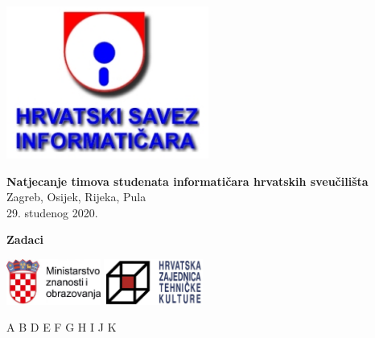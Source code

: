 \documentclass[a4paper]{article}
\begin{document}
\thispagestyle{empty}
\begin{center}
  \includegraphics[height=5cm]{pic/hsin.jpg}
\end{center}
\vspace{1cm}
\begin{center}
  {\Large\textbf{\textsf{Natjecanje timova studenata informatičara hrvatskih sveučilišta}}} \\
  \vspace{.5cm}
  {\large{\textsf{Zagreb, Osijek, Rijeka, Pula}}} \\
  \vspace{.3cm}
  \textsf{29. studenog 2020.}
\end{center}
\vspace{1cm}
\begin{center}
  {\large \textbf{Zadaci}}

  \begin{minipage}{.5\textwidth}
    \renewcommand\contentsname{}
    \tableofcontents
  \end{minipage}
\end{center}
\vspace{4cm}
\begin{center}
  \includegraphics[height=1.5cm]{pic/mzo.jpg}
  \hspace{2cm}
  \includegraphics[height=1.5cm]{pic/hztk.png}
\end{center}
\vspace{\fill}
\clearpage
\setcounter{page}{1}
{A}
{B}
{D}
{E}
{F}
{G}
{H}
{I}
{J}
{K}
\end{document}

